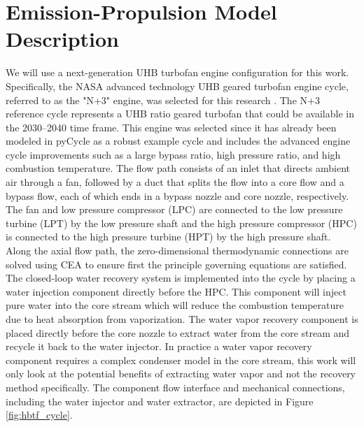 \documentclass[conf]{new-aiaa}
\begin{document}
\section{Emission-Propulsion Model Description}
\label{sec:epModel}
We will use a next-generation UHB turbofan engine configuration for this work.
Specifically, the NASA advanced technology UHB geared turbofan engine cycle, referred to as the "N+3" engine, was selected for this research \cite{Jones2017a}.
The N+3 reference cycle represents a UHB ratio geared turbofan that could be available in the 2030–2040 time frame.
This engine was selected since it has already been modeled in pyCycle as a robust example cycle and includes the advanced engine cycle improvements such as a large bypass ratio, high pressure ratio, and high combustion temperature.
The flow path consists of an inlet that directs ambient air through a fan, followed by a duct that splits the flow into a core flow and a bypass flow, each of which ends in a bypass nozzle and core nozzle, respectively.
The fan and low pressure compressor (LPC) are connected to the low pressure turbine (LPT) by the low pressure shaft and the high pressure compressor (HPC) is connected to the high pressure turbine (HPT) by the high pressure shaft.
Along the axial flow path, the zero-dimensional thermodynamic connections are solved using CEA to ensure first the principle governing equations are satisfied.
The closed-loop water recovery system is implemented into the cycle by placing a water injection component directly before the HPC.
This component will inject pure water into the core stream which will reduce the combustion temperature due to heat absorption from vaporization.
The water vapor recovery component is placed directly before the core nozzle to extract water from the core stream and recycle it back to the water injector.
In practice a water vapor recovery component requires a complex condenser model in the core stream, this work will only look at the potential benefits of extracting water vapor and not the recovery method specifically.
The component flow interface and mechanical connections, including the water injector and water extractor, are depicted in Figure \ref{fig:hbtf_cycle}.
\end{document}
